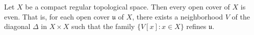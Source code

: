 Let $X$ be a compact regular topological space. Then every open cover of $X$ is even. That is, for each open cover $\mathfrak{u}$ of $X$, there exists a neighborhood $V$ of the diagonal $\Delta$ in $X \times X$ such that the family $\{V[x] : x \in X\}$ refines $\mathfrak{u}$.
